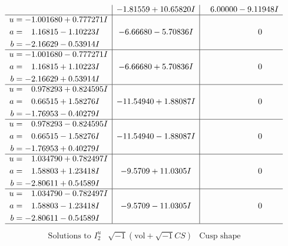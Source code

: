 \documentclass[1p]{elsarticle_modified}
\theoremstyle{definition}
\newcommand{\I}{\sqrt{-1}}
\begin{document}
$$\begin{array}{c|c|c}
 & -1.81559 + 10.65820 I & \phantom{-}6.00000 - 9.11948 I \\ \hline\begin{aligned}
u &= -1.001680 + 0.777271 I \\
a &= \phantom{-}1.16815 - 1.10223 I \\
b &= -2.16629 - 0.53914 I\end{aligned}
 & -6.66680 - 5.70836 I & \phantom{-0.000000 } 0 \\ \hline\begin{aligned}
u &= -1.001680 - 0.777271 I \\
a &= \phantom{-}1.16815 + 1.10223 I \\
b &= -2.16629 + 0.53914 I\end{aligned}
 & -6.66680 + 5.70836 I & \phantom{-0.000000 } 0 \\ \hline\begin{aligned}
u &= \phantom{-}0.978293 + 0.824595 I \\
a &= \phantom{-}0.66515 + 1.58276 I \\
b &= -1.76953 - 0.40279 I\end{aligned}
 & -11.54940 + 1.88087 I & \phantom{-0.000000 } 0 \\ \hline\begin{aligned}
u &= \phantom{-}0.978293 - 0.824595 I \\
a &= \phantom{-}0.66515 - 1.58276 I \\
b &= -1.76953 + 0.40279 I\end{aligned}
 & -11.54940 - 1.88087 I & \phantom{-0.000000 } 0 \\ \hline\begin{aligned}
u &= \phantom{-}1.034790 + 0.782497 I \\
a &= \phantom{-}1.58803 + 1.23418 I \\
b &= -2.80611 + 0.54589 I\end{aligned}
 & -9.5709 + 11.0305 I & \phantom{-0.000000 } 0 \\ \hline\begin{aligned}
u &= \phantom{-}1.034790 - 0.782497 I \\
a &= \phantom{-}1.58803 - 1.23418 I \\
b &= -2.80611 - 0.54589 I\end{aligned}
 & -9.5709 - 11.0305 I & \phantom{-0.000000 } 0\\
 \hline 
 \end{array}$$\newpage$$\begin{array}{c|c|c}  
\text{Solutions to }I^u_{2}& \I (\text{vol} + \sqrt{-1}CS) & \text{Cusp shape}\\

\end{array}$$
\end{document}
